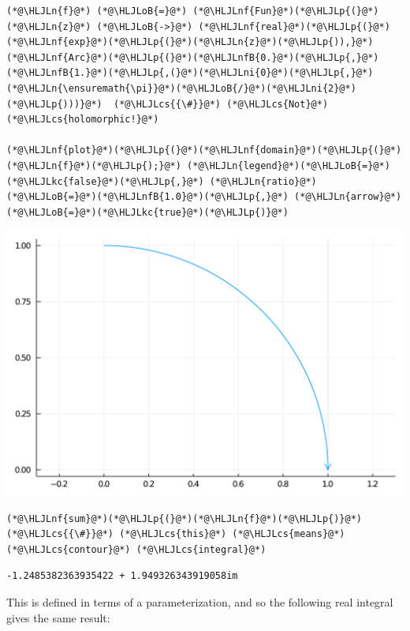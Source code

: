 \documentclass[12pt,a4paper]{article}
\newcommand{\HLJLkc}[1]{\textcolor[RGB]{59,151,46}{\textit{#1}}}
\newcommand{\HLJLn}[1]{#1}
\newcommand{\HLJLnf}[1]{\textcolor[RGB]{66,102,213}{#1}}
\newcommand{\HLJLnfB}[1]{\textcolor[RGB]{59,151,46}{#1}}
\newcommand{\HLJLni}[1]{\textcolor[RGB]{59,151,46}{#1}}
\newcommand{\HLJLoB}[1]{\textcolor[RGB]{102,102,102}{\textbf{#1}}}
\newcommand{\HLJLp}[1]{#1}
\newcommand{\HLJLcs}[1]{\textcolor[RGB]{153,153,119}{\textit{#1}}}
\begin{document}
\begin{lstlisting}
(*@\HLJLn{f}@*) (*@\HLJLoB{=}@*) (*@\HLJLnf{Fun}@*)(*@\HLJLp{(}@*) (*@\HLJLn{z}@*) (*@\HLJLoB{->}@*) (*@\HLJLnf{real}@*)(*@\HLJLp{(}@*)(*@\HLJLnf{exp}@*)(*@\HLJLp{(}@*)(*@\HLJLn{z}@*)(*@\HLJLp{)),}@*) (*@\HLJLnf{Arc}@*)(*@\HLJLp{(}@*)(*@\HLJLnfB{0.}@*)(*@\HLJLp{,}@*)(*@\HLJLnfB{1.}@*)(*@\HLJLp{,(}@*)(*@\HLJLni{0}@*)(*@\HLJLp{,}@*)(*@\HLJLn{\ensuremath{\pi}}@*)(*@\HLJLoB{/}@*)(*@\HLJLni{2}@*)(*@\HLJLp{)))}@*)  (*@\HLJLcs{{\#}}@*) (*@\HLJLcs{Not}@*) (*@\HLJLcs{holomorphic!}@*)

(*@\HLJLnf{plot}@*)(*@\HLJLp{(}@*)(*@\HLJLnf{domain}@*)(*@\HLJLp{(}@*)(*@\HLJLn{f}@*)(*@\HLJLp{);}@*) (*@\HLJLn{legend}@*)(*@\HLJLoB{=}@*)(*@\HLJLkc{false}@*)(*@\HLJLp{,}@*) (*@\HLJLn{ratio}@*)(*@\HLJLoB{=}@*)(*@\HLJLnfB{1.0}@*)(*@\HLJLp{,}@*) (*@\HLJLn{arrow}@*)(*@\HLJLoB{=}@*)(*@\HLJLkc{true}@*)(*@\HLJLp{)}@*)
\end{lstlisting}

\includegraphics[width=\linewidth]{jl_z7eR69/Lecture1_21_1.pdf}

\begin{lstlisting}
(*@\HLJLnf{sum}@*)(*@\HLJLp{(}@*)(*@\HLJLn{f}@*)(*@\HLJLp{)}@*)  (*@\HLJLcs{{\#}}@*) (*@\HLJLcs{this}@*) (*@\HLJLcs{means}@*) (*@\HLJLcs{contour}@*) (*@\HLJLcs{integral}@*)
\end{lstlisting}

\begin{lstlisting}
-1.2485382363935422 + 1.949326343919058im
\end{lstlisting}


This is defined in terms of a parameterization, and so the following real integral gives the same result:
\end{document}
